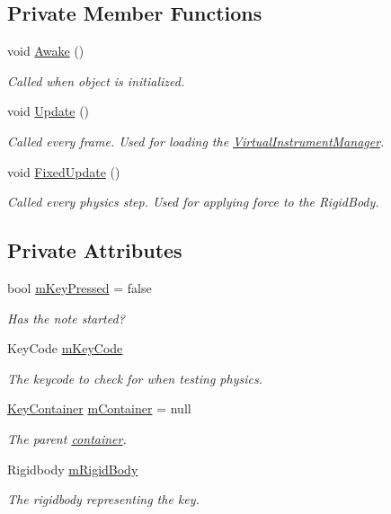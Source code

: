 \subsection*{Private Member Functions}
\begin{DoxyCompactItemize}
\item 
void \hyperlink{group___black_key_unity_ga6e05fcdf362e52d9a71b4f25ad840b5b}{Awake} ()
\begin{DoxyCompactList}\small\item\em Called when object is initialized. \end{DoxyCompactList}\item 
void \hyperlink{group___black_key_unity_ga24ef6b8b614685c5591868b9b23197ed}{Update} ()
\begin{DoxyCompactList}\small\item\em Called every frame. Used for loading the \hyperlink{class_virtual_instrument_manager}{Virtual\+Instrument\+Manager}. \end{DoxyCompactList}\item 
void \hyperlink{group___black_key_unity_gad8926397bba69558f5440eac2c38aff8}{Fixed\+Update} ()
\begin{DoxyCompactList}\small\item\em Called every physics step. Used for applying force to the Rigid\+Body. \end{DoxyCompactList}\end{DoxyCompactItemize}
\subsection*{Private Attributes}
\begin{DoxyCompactItemize}
\item 
bool \hyperlink{group___black_key_priv_var_gaf66e1f99786497961efaf5ded22e4977}{m\+Key\+Pressed} = false
\begin{DoxyCompactList}\small\item\em Has the note started? \end{DoxyCompactList}\item 
Key\+Code \hyperlink{group___black_key_priv_var_ga2272fa345880793dcd89f7ca942f6685}{m\+Key\+Code}
\begin{DoxyCompactList}\small\item\em The keycode to check for when testing physics. \end{DoxyCompactList}\item 
\hyperlink{class_key_container}{Key\+Container} \hyperlink{group___black_key_priv_var_ga11beacc28de4d17e70c4188bfdc2bdf0}{m\+Container} = null
\begin{DoxyCompactList}\small\item\em The parent \hyperlink{group___doc_key_contain}{container}. \end{DoxyCompactList}\item 
Rigidbody \hyperlink{group___black_key_priv_var_ga5185c6ea66892bcbe9e83eb615f39566}{m\+Rigid\+Body}
\begin{DoxyCompactList}\small\item\em The rigidbody representing the key. \end{DoxyCompactList}\end{DoxyCompactItemize}


